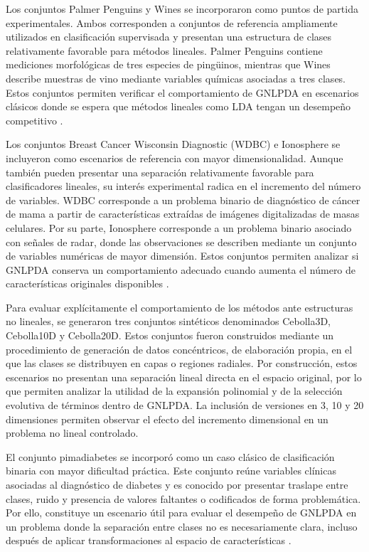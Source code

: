 Los conjuntos Palmer Penguins y Wines se incorporaron como puntos de partida
experimentales. Ambos corresponden a conjuntos de referencia ampliamente utilizados en clasificación supervisada y presentan una estructura de clases relativamente favorable para métodos lineales. Palmer Penguins contiene mediciones morfológicas de tres especies de pingüinos, mientras que Wines describe muestras de vino mediante variables químicas asociadas a tres clases. Estos conjuntos permiten verificar el comportamiento de GNLPDA en escenarios clásicos donde se espera que métodos lineales como LDA tengan un desempeño competitivo \cite{gorman2014ecological}\cite{coomans1992comparison}.

Los conjuntos Breast Cancer Wisconsin Diagnostic (WDBC) e Ionosphere se incluyeron como escenarios de referencia con mayor dimensionalidad. Aunque también pueden presentar una separación relativamente favorable para clasificadores lineales, su interés experimental radica en el incremento del número de variables. WDBC corresponde a un problema binario de diagnóstico de cáncer de mama a partir de características extraídas de imágenes digitalizadas de masas celulares. Por su parte, Ionosphere corresponde a un problema binario asociado con señales de radar, donde las observaciones se describen mediante un conjunto de variables numéricas de mayor dimensión. Estos conjuntos permiten analizar si GNLPDA conserva un comportamiento adecuado cuando aumenta el número de características originales disponibles \cite{mangasarian1995breast} \cite{sigillito1989classification}.

Para evaluar explícitamente el comportamiento de los métodos ante estructuras no lineales, se generaron tres conjuntos sintéticos denominados Cebolla3D, Cebolla10D y Cebolla20D. Estos conjuntos fueron construidos mediante un procedimiento de generación de datos concéntricos, de elaboración propia, en el que las clases se distribuyen en capas o regiones radiales. Por construcción, estos escenarios no presentan una separación lineal directa en el espacio original, por lo que permiten analizar la utilidad de la expansión polinomial y de la selección evolutiva de términos dentro de GNLPDA. La inclusión de versiones en 3, 10 y 20 dimensiones permiten observar el efecto del incremento dimensional en un problema no
lineal controlado.

El conjunto pimadiabetes se incorporó como un caso clásico de clasificación binaria con mayor dificultad práctica. Este conjunto reúne variables clínicas asociadas al diagnóstico de diabetes y es conocido por presentar traslape entre clases, ruido y presencia de valores faltantes o codificados de forma problemática. Por ello, constituye un escenario útil para evaluar el desempeño de GNLPDA en un problema donde la separación entre clases no es necesariamente clara, incluso después de aplicar transformaciones al espacio de características \cite{smith1988using}.

